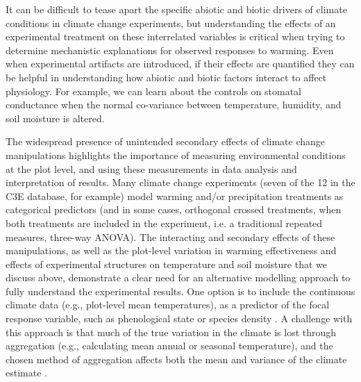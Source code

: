\documentclass{article}
\begin{document}

\par It can be difficult to tease apart the specific abiotic and biotic drivers of climate conditions in climate change experiments, but understanding the effects of an experimental treatment on these interrelated variables is critical when trying to determine mechanistic explanations for observed responses to warming. Even when experimental artifacts are introduced, if their effects are quantified they can be helpful in understanding how abiotic and biotic factors interact to affect physiology. For example, we can learn about the controls on stomatal conductance when the normal co-variance between temperature, humidity, and soil moisture is altered. 
\par The widespread presence of unintended secondary effects of climate change manipulations highlights the importance of measuring environmental conditions at the plot level, and using these measurements in data analysis and interpretation of results. Many climate change experiments (seven of the 12 in the C3E database, for example) model warming and/or precipitation treatments as categorical predictors (and in some cases, orthogonal crossed treatments, when both treatments are included in the experiment, i.e. a traditional repeated measures, three-way ANOVA). The interacting and secondary effects of these manipulations, as well as the plot-level variation in warming effectiveness and effects of experimental structures on temperature and soil moisture that we discuss above, demonstrate a clear need for an alternative modelling approach to fully understand the experimental results. One option is to include the continuous climate data (e.g., plot-level mean temperatures), as a predictor of the focal response variable, such as phenological state or species density \citep [e.g.,][]{marchin2015, pelini2014}. A challenge with this approach is that much of the true variation in the climate is lost through aggregation (e.g., calculating mean annual or seasonal temperature), and the chosen method of aggregation affects both the mean and variance of the climate estimate \citep [e.g.,][]{clark2014b}. 
\end{document}
